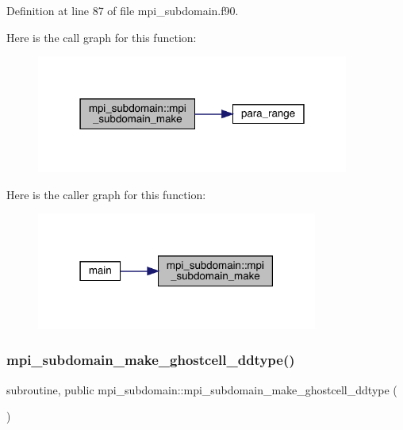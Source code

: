 Definition at line 87 of file mpi\+\_\+subdomain.\+f90.

Here is the call graph for this function\+:
\nopagebreak
\begin{figure}[H]
\begin{center}
\leavevmode
\includegraphics[width=291pt]{namespacempi__subdomain_a3a1e7cf64aafbebd3c09b92fc56bd311_cgraph}
\end{center}
\end{figure}
Here is the caller graph for this function\+:
\nopagebreak
\begin{figure}[H]
\begin{center}
\leavevmode
\includegraphics[width=262pt]{namespacempi__subdomain_a3a1e7cf64aafbebd3c09b92fc56bd311_icgraph}
\end{center}
\end{figure}
\mbox{\label{namespacempi__subdomain_ad788c273d92ea7058caf0874bffdad6d}} 
\subsubsection{\texorpdfstring{mpi\_subdomain\_make\_ghostcell\_ddtype()}{mpi\_subdomain\_make\_ghostcell\_ddtype()}}
{\footnotesize\ttfamily subroutine, public mpi\+\_\+subdomain\+::mpi\+\_\+subdomain\+\_\+make\+\_\+ghostcell\+\_\+ddtype (\begin{DoxyParamCaption}{ }\end{DoxyParamCaption})}



